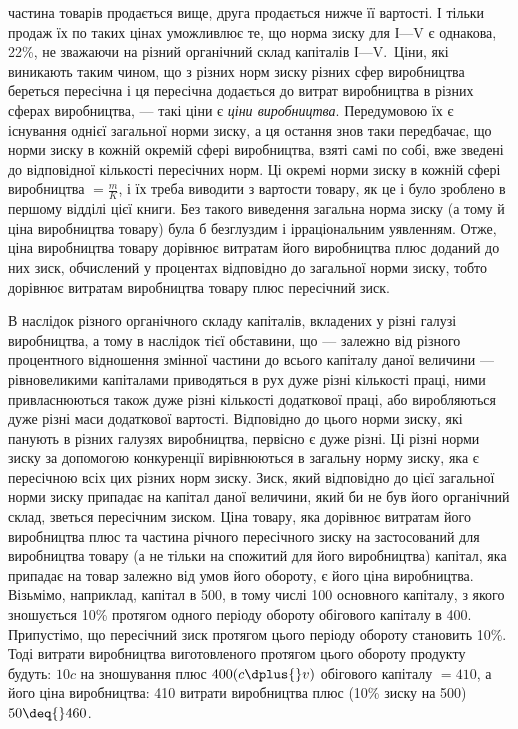 частина товарів продається вище, друга продається нижче її
вартості. І тільки продаж їх по таких цінах уможливлює те, що
норма зиску для І—V є однакова, 22\%, не зважаючи на різний
органічний склад капіталів І—V.~Ціни, які виникають таким чином, що з різних норм зиску різних сфер
виробництва береться
пересічна і ця пересічна додається до витрат виробництва в різних сферах виробництва, — такі ціни є
\emph{ціни виробництва}. Передумовою їх є існування однієї загальної норми зиску, а ця
остання знов таки передбачає, що норми зиску в кожній окремій сфері виробництва, взяті самі по собі,
вже зведені до
відповідної кількості пересічних норм. Ці окремі норми зиску в кожній сфері виробництва $= \frac{m}{K}$, і їх
треба виводити з вартости товару, як це і було зроблено в першому відділі цієї книги. Без такого
виведення загальна норма зиску (а тому й ціна виробництва товару) була б безглуздим і ірраціональним
уявленням. Отже, ціна виробництва товару дорівнює витратам його
виробництва плюс доданий до них зиск, обчислений у процентах
відповідно до загальної норми зиску, тобто дорівнює витратам
виробництва товару плюс пересічний зиск.

В наслідок різного органічного складу капіталів, вкладених
у різні галузі виробництва, а тому в наслідок тієї обставини,
що — залежно від різного процентного відношення змінної частини до всього капіталу даної величини —
рівновеликими капіталами приводяться в рух дуже різні кількості праці, ними привласнюються також
дуже різні кількості додаткової праці, або
виробляються дуже різні маси додаткової вартості. Відповідно
до цього норми зиску, які панують в різних галузях виробництва,
первісно є дуже різні. Ці різні норми зиску за допомогою конкуренції вирівнюються в загальну
норму зиску, яка
є пересічною всіх цих різних норм зиску. Зиск, який відповідно
до цієї загальної норми зиску припадає на капітал даної величини, який би не був його органічний
склад, зветься пересічним
зиском. Ціна товару, яка дорівнює витратам його виробництва
плюс та частина річного пересічного зиску на застосований для
виробництва товару (а не тільки на спожитий для його виробництва) капітал, яка припадає на товар
залежно від умов його
обороту, є його ціна виробництва. Візьмімо, наприклад, капітал
в 500, в тому числі 100 основного капіталу, з якого зношується
10\% протягом одного періоду обороту обігового капіталу в 400.
Припустімо, що пересічний зиск протягом цього періоду обороту становить 10\%. Тоді витрати
виробництва виготовленого
протягом цього обороту продукту будуть: $10 c$ на зношування
плюс $400 (c \dplus{} v)$ обігового капіталу $= 410$, а його ціна виробництва: 410 витрати виробництва плюс
(10\% зиску на 500) $50 \deq{} 460$.

